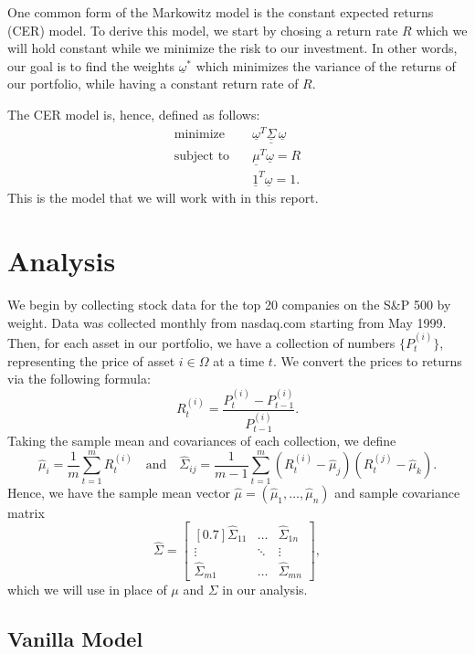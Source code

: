 \documentclass{article}
\renewcommand{\vec}[1]{\underline{#1}}
\newcommand{\mat}[1]{\underline{\underline{#1}}}
\theoremstyle{definition}
\begin{document}
One common form of the Markowitz model is the constant expected returns (CER) model. To derive this model, we start by chosing a return rate $R$ which we will hold constant while we minimize the risk to our investment. In other words, our goal is to find the weights $\vec\omega^*$ which minimizes the variance of the returns of our portfolio, while having a constant return rate of $R$. 

The CER model is, hence, defined as follows:
\begin{align*}
	\text{minimize} \quad & \vec\omega^T \mat\Sigma \, \vec\omega \\	
	\text{subject to} \quad & \vec\mu^T \vec\omega = R \\
				& \vec 1^T \vec\omega = 1.
\end{align*}
This is the model that we will work with in this report. 



\section{Analysis}

We begin by collecting stock data for the top 20 companies on the S\&P 500 by weight. Data was collected monthly from nasdaq.com starting from May 1999. Then, for each asset in our portfolio, we have a collection of numbers $\{ P_t^{(i)} \}$, representing the price of asset $i \in \Omega$ at a time $t$. We convert the prices to returns via the following formula:
$$R_t^{(i)} = \frac{P_t^{(i)} - P_{t-1}^{(i)}}{P_{t-1}^{(i)}}.$$
Taking the sample mean and covariances of each collection, we define 
$$\hat\mu_i = \frac{1}{m} \sum_{t=1}^m R_t^{(i)} \quad \text{and} \quad \hat\Sigma_{ij} = \frac{1}{m-1} \sum_{t=1}^m (R_t^{(i)} - \hat\mu_j)(R_t^{(j)} - \hat\mu_k).$$
Hence, we have the sample mean vector $\hat\mu = (\hat\mu_1, \dots, \hat\mu_n)$ and sample covariance matrix 
$$\hat\Sigma = \begin{bmatrix}[0.7]
	\hat\Sigma_{11} & \dots & \hat\Sigma_{1n} \\
	\vdots & \ddots & \vdots \\
	\hat\Sigma_{m1} & \dots & \hat\Sigma_{mn}
\end{bmatrix},$$
which we will use in place of $\mu$ and $\Sigma$ in our analysis. 

\subsection{Vanilla Model}
\end{document}
